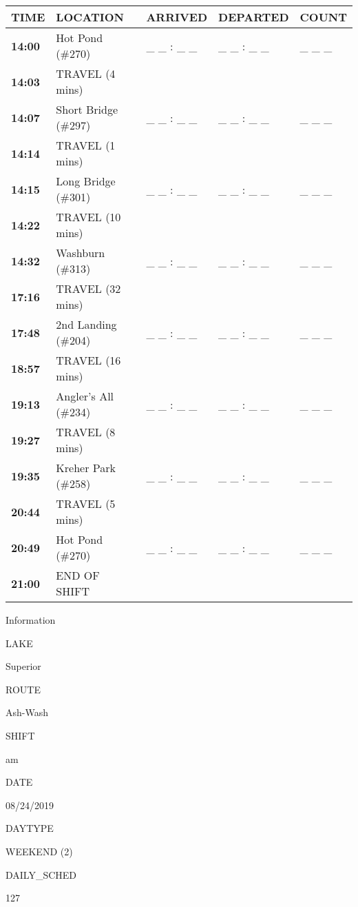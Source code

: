 \documentclass[]{article}
\begin{document}
\begin{tabular}{>{\bfseries}lllll}
\toprule
\textbf{TIME} & \textbf{LOCATION} & \textbf{ARRIVED} & \textbf{DEPARTED} & \textbf{COUNT}\\
\midrule
14:00 & Hot Pond (\#270) & \_ \_ : \_ \_ & \_ \_ : \_ \_ & \_ \_ \_\\
14:03 & TRAVEL (4 mins) &  &  & \\
14:07 & Short Bridge (\#297) & \_ \_ : \_ \_ & \_ \_ : \_ \_ & \_ \_ \_\\
14:14 & TRAVEL (1 mins) &  &  & \\
14:15 & Long Bridge (\#301) & \_ \_ : \_ \_ & \_ \_ : \_ \_ & \_ \_ \_\\
14:22 & TRAVEL (10 mins) &  &  & \\
14:32 & Washburn (\#313) & \_ \_ : \_ \_ & \_ \_ : \_ \_ & \_ \_ \_\\
17:16 & TRAVEL (32 mins) &  &  & \\
17:48 & 2nd Landing (\#204) & \_ \_ : \_ \_ & \_ \_ : \_ \_ & \_ \_ \_\\
18:57 & TRAVEL (16 mins) &  &  & \\
19:13 & Angler's All (\#234) & \_ \_ : \_ \_ & \_ \_ : \_ \_ & \_ \_ \_\\
19:27 & TRAVEL (8 mins) &  &  & \\
19:35 & Kreher Park (\#258) & \_ \_ : \_ \_ & \_ \_ : \_ \_ & \_ \_ \_\\
20:44 & TRAVEL (5 mins) &  &  & \\
20:49 & Hot Pond (\#270) & \_ \_ : \_ \_ & \_ \_ : \_ \_ & \_ \_ \_\\
21:00 & END OF SHIFT &  &  & \\
\bottomrule
\end{tabular}\newpage

Information

LAKE

Superior

ROUTE

Ash-Wash

SHIFT

am

DATE

08/24/2019

DAYTYPE

WEEKEND (2)

DAILY\_SCHED

127

\vspace{24pt}
\end{document}
